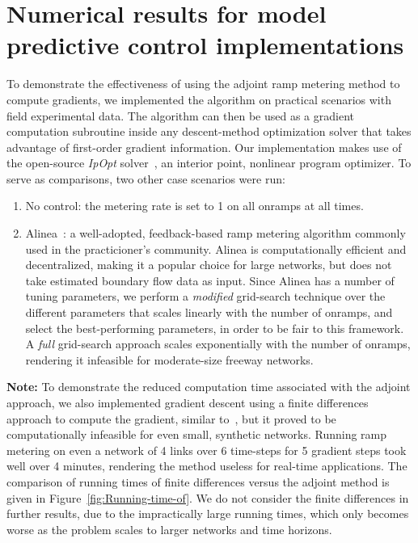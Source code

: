\section{Numerical results for model predictive control implementations\label{sec:Numerical-results-for}}

To demonstrate the effectiveness of using the adjoint ramp metering
method to compute gradients, we implemented the algorithm on practical scenarios with field experimental data.
The algorithm can then be used as a gradient computation subroutine
inside any descent-method optimization solver that takes advantage
of first-order gradient information. Our implementation makes use
of the open-source \emph{IpOpt} solver~\cite{Andreas2005}, an interior point, nonlinear program optimizer. To serve
as comparisons, two other case scenarios were run:
\begin{enumerate}
	\item No control: the metering rate is set to 1 on all onramps at all times.
	\item Alinea~\cite{Papageorgiou1991}: a well-adopted, feedback-based ramp metering
	algorithm commonly used in the practicioner's community. Alinea is computationally efficient and decentralized,
	making it a popular choice for large networks, but does not take estimated
	boundary flow data as input. Since Alinea has a number of tuning parameters,
	we perform a \emph{modified} grid-search technique over the different
	parameters that scales linearly with the number of onramps, and select
	the best-performing parameters, in order to be fair to this framework. A \emph{full} grid-search approach
	scales exponentially with the number of onramps, rendering it infeasible
	for moderate-size freeway networks.
\end{enumerate}
\textbf{Note: } To demonstrate the reduced computation time associated with the adjoint approach, we also implemented gradient descent using a finite differences approach to compute the gradient, similar to~\cite{Frejo2011,Ramon2013}, but it proved to be computationally infeasible for even small, synthetic
networks. Running ramp metering on even a network of 4 links over
6 time-steps for 5 gradient steps took well over 4 minutes,
rendering the method useless for real-time applications. The comparison
of running times of finite differences versus the adjoint method is given in
Figure~\ref{fig:Running-time-of}. We do not consider the finite differences in further results, due to the impractically large running times, which only becomes worse as the problem scales to larger networks and time horizons.
